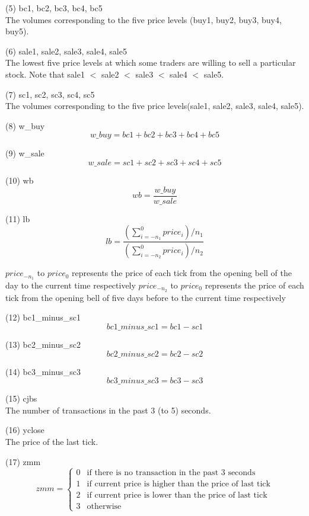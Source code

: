 \documentclass[10pt, conference, compsocconf]{IEEEtran}
\begin{document}
\begin{enumerate}
	(5) bc1, bc2, bc3, bc4, bc5\\
	The volumes corresponding to the five price levels (buy1, buy2, buy3, buy4, buy5).

	(6) sale1, sale2, sale3, sale4, sale5\\
	The lowest five price levels at which some traders are willing to sell a particular stock. Note that sale1 $<$ sale2 $<$ sale3 $<$ sale4 $<$ sale5. 

	(7) sc1, sc2, sc3, sc4, sc5\\
	The volumes corresponding to the five price levels(sale1, sale2, sale3, sale4, sale5).

	(8) w\_buy\\
	$$
		w\_buy = bc1 + bc2 + bc3 + bc4 + bc5
	$$

	(9) w\_sale\\
	$$
		w\_sale = sc1 + sc2 + sc3 + sc4 + sc5
	$$

	(10) wb\\
	$$
		wb = \frac{w\_buy}{w\_sale}
	$$

	(11) lb
	$$
		lb = \frac{(\sum_{i=-n_1}^{0} price_i)/n_1}{(\sum_{i=-n_2}^{0}price_i)/n_2}
	$$

	$price_{-n_1}$ to $price_0$ represents the price of each tick from the opening bell of 
	the day to the current time respectively
	$price_{-n_2}$ to $price_0$ represents the price of each tick from the opening bell of 
	five days before to the current time respectively

	(12) bc1\_minus\_sc1\\
	$$
		bc1\_minus\_sc1 = bc1 - sc1
	$$

	(13) bc2\_minus\_sc2\\
	$$
		bc2\_minus\_sc2 = bc2 - sc2
	$$

	(14) bc3\_minus\_sc3\\
	$$
		bc3\_minus\_sc3 = bc3 - sc3
	$$

	(15) cjbs\\
	The number of transactions in the past 3 (to 5) seconds.

	(16) yclose\\
	The price of the last tick.

	(17) zmm\\
	$$
		zmm = 
		\begin{cases}
			0 & \text{if there is no transaction in the past 3 seconds}\\
			1 & \text{if current price is higher than the price of last tick}\\
			2 & \text{if current price is lower than the price of last tick}\\
			3 & \text{otherwise}
		\end{cases}
	$$


\end{enumerate}
\end{document}
